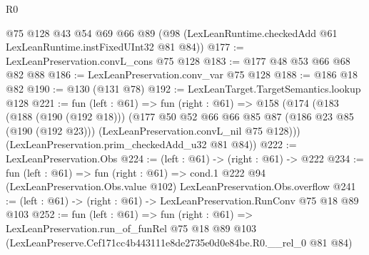\begin{lexlean}{R0}
\begin{coremodule}
    @75
    @128
    @43
    @54
    @69
    @66
    @89
    (@98 (LexLeanRuntime.checkedAdd @61 LexLeanRuntime.instFixedUInt32 @81 @84))
@177 := LexLeanPreservation.convL_cons @75 @128
@183 := @177 @48 @53 @66 @68 @82 @88
@186 := LexLeanPreservation.conv_var @75 @128
@188 := @186 @18 @82
@190 := @130 (@131 @78)
@192 := LexLeanTarget.TargetSemantics.lookup @128
@221 := fun (left : @61) =>
  fun (right : @61) =>
  @158
    (@174
      (@183
        (@188 (@190 (@192 @18)))
        (@177
          @50
          @52
          @66
          @66
          @85
          @87
          (@186 @23 @85 (@190 (@192 @23)))
          (LexLeanPreservation.convL_nil @75 @128)))
      (LexLeanPreservation.prim_checkedAdd_u32 @81 @84))
@222 := LexLeanPreservation.Obs
@224 := (left : @61) -> (right : @61) -> @222
@234 := fun (left : @61) =>
  fun (right : @61) =>
  cond.{1} @222 @94 (LexLeanPreservation.Obs.value @102) LexLeanPreservation.Obs.overflow
@241 := (left : @61) -> (right : @61) -> LexLeanPreservation.RunConv @75 @18 @89 @103
@252 := fun (left : @61) =>
  fun (right : @61) =>
  LexLeanPreservation.run_of_funRel
    @75
    @18
    @89
    @103
    (LexLeanPreserve.Cef171cc4b443111e8de2735e0d0e84be.R0.__rel_0 @81 @84)
\end{coremodule}
\end{lexlean}
